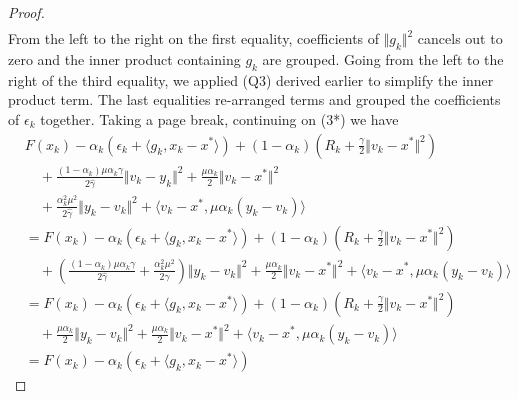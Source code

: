 \documentclass[12pt]{article}
\begin{document}
\begin{proof}
\begin{align*}
        \tag{3*}
        \end{align*}
        From the left to the right on the first equality, coefficients of $\Vert g_k\Vert^2$ cancels out to zero and the inner product containing $g_k$ are grouped. 
        Going from the left to the right of the third equality, we applied (Q3) derived earlier to simplify the inner product term. 
        The last equalities re-arranged terms and grouped the coefficients of $\epsilon_k$ together. 
        Taking a page break, continuing on (3*) we have
        \begin{align*}
            &
            F(x_k) - \alpha_k(\epsilon_k + \langle g_k, x_k - x^*\rangle)
            + 
            (1 - \alpha_k)\left(
                R_k + \frac{\gamma}{2}\Vert v_k - x^*\Vert^2
            \right)
            \\&\quad 
                + \frac{(1 - \alpha_k)\mu\alpha_k\gamma}{2\hat \gamma}\Vert v_k - y_k\Vert^2
                + \frac{\mu \alpha_k}{2}\Vert v_k - x^*\Vert^2
            \\&\quad 
                + \frac{\alpha_k^2 \mu^2}{2\hat \gamma}\Vert y_k - v_k\Vert^2
                + \langle v_k - x^*, \mu\alpha_k(y_k - v_k)\rangle
            \\
            &= 
            F(x_k) - \alpha_k(\epsilon_k + \langle g_k, x_k - x^*\rangle)
            + 
            (1 - \alpha_k)\left(
                R_k + \frac{\gamma}{2}\Vert v_k - x^*\Vert^2
            \right)
            \\ &\quad 
                + 
                \left(
                    \frac{(1 - \alpha_k)\mu\alpha_k\gamma}{2\hat \gamma}
                    + 
                    \frac{\alpha_k^2 \mu^2}{2\hat \gamma}
                \right)\Vert y_k - v_k\Vert^2
                + \frac{\mu \alpha_k}{2}\Vert v_k - x^*\Vert^2 
                + \langle v_k - x^*, \mu\alpha_k(y_k - v_k)\rangle
            \\
            & =
            F(x_k) - \alpha_k(\epsilon_k + \langle g_k, x_k - x^*\rangle)
            + 
            (1 - \alpha_k)\left(
                R_k + \frac{\gamma}{2}\Vert v_k - x^*\Vert^2
            \right)
            \\ &\quad 
                + 
                \frac{\mu \alpha_k}{2}\Vert y_k - v_k\Vert^2
                + \frac{\mu \alpha_k}{2}\Vert v_k - x^*\Vert^2 
                + \langle v_k - x^*, \mu\alpha_k(y_k - v_k)\rangle
            \\ &=
            F(x_k) - \alpha_k(\epsilon_k + \langle g_k, x_k - x^*\rangle)

\end{align*}
\end{proof}
\end{document}
